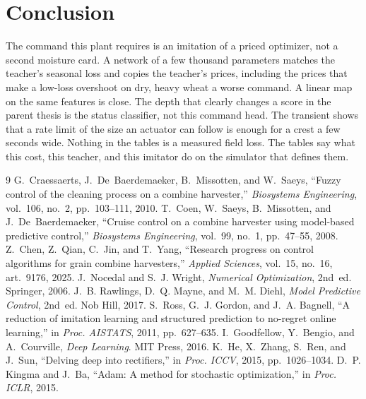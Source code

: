 \documentclass[11pt,a4paper]{article}
\begin{document}
\section{Conclusion}

The command this plant requires is an imitation of a priced optimizer, not a second moisture card. A network of a few thousand parameters matches the teacher's seasonal loss and copies the teacher's prices, including the prices that make a low-loss overshoot on dry, heavy wheat a worse command. A linear map on the same features is close. The depth that clearly changes a score in the parent thesis is the status classifier, not this command head. The transient shows that a rate limit of the size an actuator can follow is enough for a crest a few seconds wide. Nothing in the tables is a measured field loss. The tables say what this cost, this teacher, and this imitator do on the simulator that defines them.

\begin{thebibliography}{9}
G.~Craessaerts, J.~De~Baerdemaeker, B.~Missotten, and W.~Saeys,
``Fuzzy control of the cleaning process on a combine harvester,''
\emph{Biosystems Engineering}, vol.~106, no.~2, pp.~103--111, 2010.
T.~Coen, W.~Saeys, B.~Missotten, and J.~De~Baerdemaeker,
``Cruise control on a combine harvester using model-based predictive control,''
\emph{Biosystems Engineering}, vol.~99, no.~1, pp.~47--55, 2008.
Z.~Chen, Z.~Qian, C.~Jin, and T.~Yang,
``Research progress on control algorithms for grain combine harvesters,''
\emph{Applied Sciences}, vol.~15, no.~16, art.~9176, 2025.
J.~Nocedal and S.~J. Wright, \emph{Numerical Optimization}, 2nd~ed. Springer, 2006.
J.~B. Rawlings, D.~Q. Mayne, and M.~M. Diehl,
\emph{Model Predictive Control}, 2nd~ed. Nob Hill, 2017.
S.~Ross, G.~J. Gordon, and J.~A. Bagnell,
``A reduction of imitation learning and structured prediction to no-regret online learning,''
in \emph{Proc. AISTATS}, 2011, pp.~627--635.
I.~Goodfellow, Y.~Bengio, and A.~Courville, \emph{Deep Learning}. MIT Press, 2016.
K.~He, X.~Zhang, S.~Ren, and J.~Sun,
``Delving deep into rectifiers,''
in \emph{Proc. ICCV}, 2015, pp.~1026--1034.
D.~P. Kingma and J.~Ba,
``Adam: A method for stochastic optimization,''
in \emph{Proc. ICLR}, 2015.
\end{thebibliography}
\end{document}
